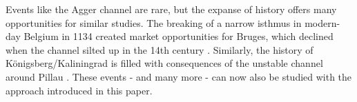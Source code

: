\documentclass[11pt]{article}
\begin{document}
Events like the Agger channel are rare, but the expanse of history offers many opportunities for similar studies. The breaking of a narrow isthmus in modern-day Belgium in 1134 created market opportunities for Bruges, which declined when the channel silted up in the 14th century \citep{Houtte1966, Charlier2011}. Similarly, the history of Königsberg/Kaliningrad is filled with consequences of the unstable channel around Pillau \citep{Britannica2018}. These events - and many more - can now also be studied with the approach introduced in this paper. 

\newpage



\newpage

\end{document}
